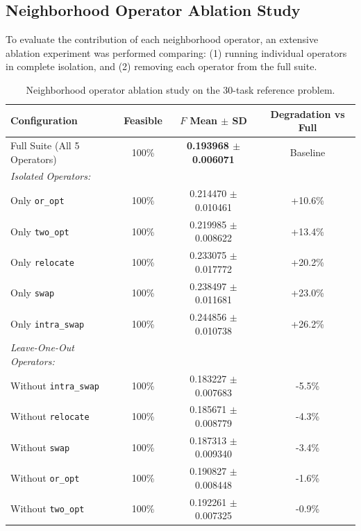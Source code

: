 \subsection{Neighborhood Operator Ablation Study}
To evaluate the contribution of each neighborhood operator, an extensive ablation experiment was performed comparing: (1) running individual operators in complete isolation, and (2) removing each operator from the full suite.

\begin{table}[htbp]
\centering
\small
\caption{Neighborhood operator ablation study on the 30-task reference problem.}
\label{tab:param_ablation}
\begin{tabular}{lccc}
\toprule
\textbf{Configuration} & \textbf{Feasible} & \textbf{$F$ Mean $\pm$ SD} & \textbf{Degradation vs Full} \\
\midrule
Full Suite (All 5 Operators) & 100\% & \textbf{0.193968 $\pm$ 0.006071} & Baseline \\
\midrule
\textit{Isolated Operators:} & & & \\
Only \texttt{or\_opt} & 100\% & 0.214470 $\pm$ 0.010461 & +10.6\% \\
Only \texttt{two\_opt} & 100\% & 0.219985 $\pm$ 0.008622 & +13.4\% \\
Only \texttt{relocate} & 100\% & 0.233075 $\pm$ 0.017772 & +20.2\% \\
Only \texttt{swap} & 100\% & 0.238497 $\pm$ 0.011681 & +23.0\% \\
Only \texttt{intra\_swap} & 100\% & 0.244856 $\pm$ 0.010738 & +26.2\% \\
\midrule
\textit{Leave-One-Out Operators:} & & & \\
Without \texttt{intra\_swap} & 100\% & 0.183227 $\pm$ 0.007683 & -5.5\% \\
Without \texttt{relocate} & 100\% & 0.185671 $\pm$ 0.008779 & -4.3\% \\
Without \texttt{swap} & 100\% & 0.187313 $\pm$ 0.009340 & -3.4\% \\
Without \texttt{or\_opt} & 100\% & 0.190827 $\pm$ 0.008448 & -1.6\% \\
Without \texttt{two\_opt} & 100\% & 0.192261 $\pm$ 0.007325 & -0.9\% \\
\bottomrule
\end{tabular}
\end{table}

